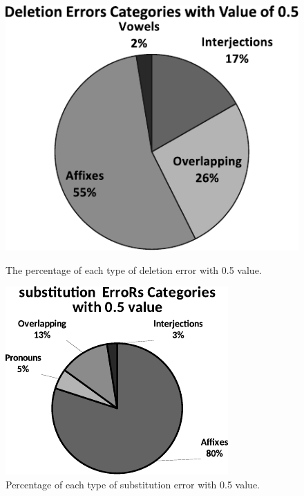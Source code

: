 \documentclass[english]{textolivre}
\begin{document}
\begin{figure}[h]
\begin{minipage}[t]{0.47\textwidth}
\includegraphics[width=\linewidth]{Figure5.pdf}
\caption{The percentage of each type of deletion error with 0.5 value.}\label{fig:fig5}
\end{minipage}
\hfill
\begin{minipage}[t]{0.47\textwidth}
\includegraphics[width=\linewidth]{Figure6.pdf}
\caption{Percentage of each type of substitution error with 0.5 value.}\label{fig:fig6}
\end{minipage}
\end{figure}
\end{document}
